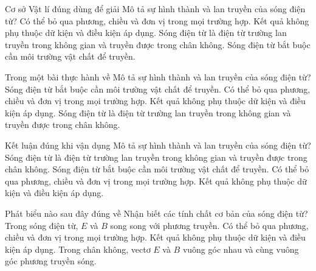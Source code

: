 \begin{ex}
Cơ sở Vật lí đúng dùng để giải Mô tả sự hình thành và lan truyền của sóng điện từ?
\choice
{Có thể bỏ qua phương, chiều và đơn vị trong mọi trường hợp.}
{Kết quả không phụ thuộc dữ kiện và điều kiện áp dụng.}
{\True Sóng điện từ là điện từ trường lan truyền trong không gian và truyền được trong chân không.}
{Sóng điện từ bắt buộc cần môi trường vật chất để truyền.}
\end{ex}

\begin{ex}
Trong một bài thực hành về Mô tả sự hình thành và lan truyền của sóng điện từ?
\choice
{Sóng điện từ bắt buộc cần môi trường vật chất để truyền.}
{Có thể bỏ qua phương, chiều và đơn vị trong mọi trường hợp.}
{Kết quả không phụ thuộc dữ kiện và điều kiện áp dụng.}
{\True Sóng điện từ là điện từ trường lan truyền trong không gian và truyền được trong chân không.}
\end{ex}

\begin{ex}
Kết luận đúng khi vận dụng Mô tả sự hình thành và lan truyền của sóng điện từ?
\choice
{\True Sóng điện từ là điện từ trường lan truyền trong không gian và truyền được trong chân không.}
{Sóng điện từ bắt buộc cần môi trường vật chất để truyền.}
{Có thể bỏ qua phương, chiều và đơn vị trong mọi trường hợp.}
{Kết quả không phụ thuộc dữ kiện và điều kiện áp dụng.}
\end{ex}

\begin{ex}
Phát biểu nào sau đây đúng về Nhận biết các tính chất cơ bản của sóng điện từ?
\choice
{Trong sóng điện từ, $E$ và $B$ song song với phương truyền.}
{Có thể bỏ qua phương, chiều và đơn vị trong mọi trường hợp.}
{Kết quả không phụ thuộc dữ kiện và điều kiện áp dụng.}
{\True Trong chân không, vectơ $E$ và $B$ vuông góc nhau và cùng vuông góc phương truyền sóng.}
\end{ex}

